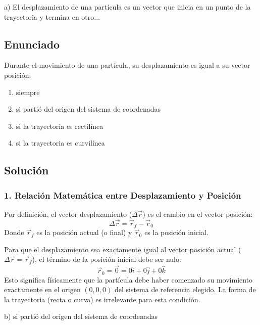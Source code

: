 \documentclass[12pt, a4paper]{article}
\begin{document}
\begin{tcolorbox}[colback=green!5!white, colframe=green!50!black, title=Respuesta Final]
\centering \Large a) El desplazamiento de una partícula es un vector que inicia en un punto de la trayectoria y termina en otro...
\end{tcolorbox}

\newpage


\subsection*{Enunciado}
Durante el movimiento de una partícula, su desplazamiento es igual a su vector posición:
\begin{enumerate}[label=\alph*)]
    \item siempre
    \item si partió del origen del sistema de coordenadas
    \item si la trayectoria es rectilínea
    \item si la trayectoria es curvilínea
\end{enumerate}

\subsection*{Solución}

\subsubsection*{1. Relación Matemática entre Desplazamiento y Posición}
Por definición, el vector desplazamiento ($\Delta \vec{r}$) es el cambio en el vector posición:
$$ \Delta \vec{r} = \vec{r}_f - \vec{r}_0 $$
Donde $\vec{r}_f$ es la posición actual (o final) y $\vec{r}_0$ es la posición inicial. 

Para que el desplazamiento sea exactamente igual al vector posición actual ($\Delta \vec{r} = \vec{r}_f$), el término de la posición inicial debe ser nulo:
$$ \vec{r}_0 = \vec{0} = 0\hat{i} + 0\hat{j} + 0\hat{k} $$
Esto significa físicamente que la partícula debe haber comenzado su movimiento exactamente en el origen $(0,0,0)$ del sistema de referencia elegido. La forma de la trayectoria (recta o curva) es irrelevante para esta condición.

\begin{tcolorbox}[colback=green!5!white, colframe=green!50!black, title=Respuesta Final]
\centering \Large b) si partió del origen del sistema de coordenadas
\end{tcolorbox}
\end{document}
